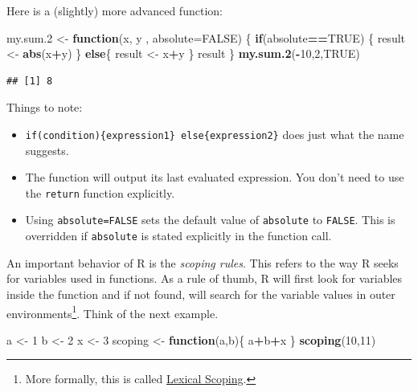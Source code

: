 \documentclass[]{book}
\newenvironment{Shaded}{\begin{snugshade}}{\end{snugshade}}
\newcommand{\KeywordTok}[1]{\textcolor[rgb]{0.13,0.29,0.53}{\textbf{#1}}}
\newcommand{\DataTypeTok}[1]{\textcolor[rgb]{0.13,0.29,0.53}{#1}}
\newcommand{\DecValTok}[1]{\textcolor[rgb]{0.00,0.00,0.81}{#1}}
\newcommand{\StringTok}[1]{\textcolor[rgb]{0.31,0.60,0.02}{#1}}
\newcommand{\OtherTok}[1]{\textcolor[rgb]{0.56,0.35,0.01}{#1}}
\newcommand{\ControlFlowTok}[1]{\textcolor[rgb]{0.13,0.29,0.53}{\textbf{#1}}}
\newcommand{\OperatorTok}[1]{\textcolor[rgb]{0.81,0.36,0.00}{\textbf{#1}}}
\newcommand{\NormalTok}[1]{#1}
\theoremstyle{definition}
\theoremstyle{definition}
\theoremstyle{definition}
\theoremstyle{remark}
\begin{document}
Here is a (slightly) more advanced function:

\begin{Shaded}
\begin{Highlighting}[]
\NormalTok{my.sum.}\DecValTok{2}\NormalTok{ <-}\StringTok{ }\ControlFlowTok{function}\NormalTok{(x, y , }\DataTypeTok{absolute=}\OtherTok{FALSE}\NormalTok{) \{}
  \ControlFlowTok{if}\NormalTok{(absolute}\OperatorTok{==}\OtherTok{TRUE}\NormalTok{) \{}
\NormalTok{    result <-}\StringTok{ }\KeywordTok{abs}\NormalTok{(x}\OperatorTok{+}\NormalTok{y)}
\NormalTok{  \}}
  \ControlFlowTok{else}\NormalTok{\{}
\NormalTok{    result <-}\StringTok{ }\NormalTok{x}\OperatorTok{+}\NormalTok{y}
\NormalTok{  \} }
\NormalTok{  result}
\NormalTok{\}}
\KeywordTok{my.sum.2}\NormalTok{(}\OperatorTok{-}\DecValTok{10}\NormalTok{,}\DecValTok{2}\NormalTok{,}\OtherTok{TRUE}\NormalTok{)}
\end{Highlighting}
\end{Shaded}

\begin{verbatim}
## [1] 8
\end{verbatim}

Things to note:

\begin{itemize}
\item
  \texttt{if(condition)\{expression1\}\ else\{expression2\}} does just
  what the name suggests.
\item
  The function will output its last evaluated expression. You don't need
  to use the \texttt{return} function explicitly.
\item
  Using \texttt{absolute=FALSE} sets the default value of
  \texttt{absolute} to \texttt{FALSE}. This is overridden if
  \texttt{absolute} is stated explicitly in the function call.
\end{itemize}

An important behavior of R is the \emph{scoping rules}. This refers to
the way R seeks for variables used in functions. As a rule of thumb, R
will first look for variables inside the function and if not found, will
search for the variable values in outer environments\footnote{More
  formally, this is called
  \href{https://darrenjw.wordpress.com/2011/11/23/lexical-scope-and-function-closures-in-r/}{Lexical
  Scoping}.}. Think of the next example.

\begin{Shaded}
\begin{Highlighting}[]
\NormalTok{a <-}\StringTok{ }\DecValTok{1}
\NormalTok{b <-}\StringTok{ }\DecValTok{2}
\NormalTok{x <-}\StringTok{ }\DecValTok{3}
\NormalTok{scoping <-}\StringTok{ }\ControlFlowTok{function}\NormalTok{(a,b)\{}
\NormalTok{  a}\OperatorTok{+}\NormalTok{b}\OperatorTok{+}\NormalTok{x}
\NormalTok{\}}
\KeywordTok{scoping}\NormalTok{(}\DecValTok{10}\NormalTok{,}\DecValTok{11}\NormalTok{)}
\end{Highlighting}
\end{Shaded}
\end{document}
